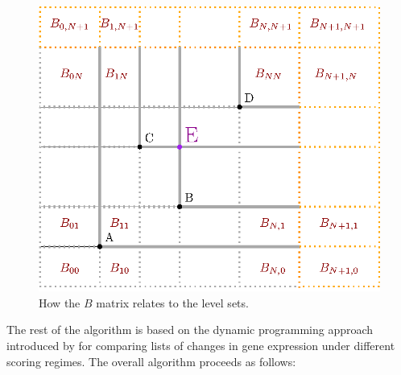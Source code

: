 \begin{figure}
	\centering \includegraphics[scale=1]{./img/KS2.eps}
	\caption{How the $B$ matrix relates to the \ecdf level sets.}\label{spaceDivision}
\end{figure}


The rest of the algorithm is based on the dynamic programming approach introduced by \citet*{NiVingron} for comparing lists of changes in gene expression under different scoring regimes. The overall algorithm proceeds as follows:

